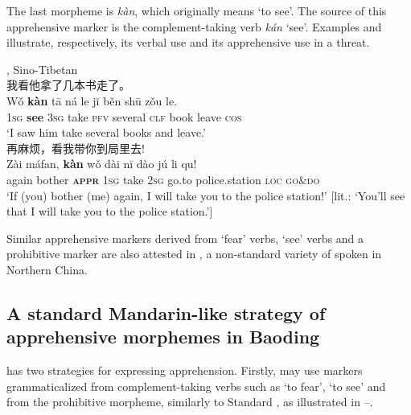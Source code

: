 \documentclass[output=paper,colorlinks,citecolor=brown, language=chinese]{langscibook}
\begin{document}
 The last morpheme is \textit{kàn}, which originally means `to see'. The source of this apprehensive marker is the complement-taking verb \textit{kán} `see'. Examples  and  illustrate, respectively, its verbal use and its apprehensive use in a threat.


\ea \label{ex:Song7} 
 {, Sino-Tibetan} {\cite{Gao2003}} \\
\ea \label{ex:Song7a} {\cn 我看他拿了几本书走了。} \\
\gll Wǒ \textbf{kàn} tā ná le jĭ běn shū zǒu le. \\
\textsc{1sg} \textbf{see} \textsc{3sg} take \textsc{pfv} several \textsc{clf} book leave \textsc{cos} \\
\glt `I saw him take several books and leave.' \\
\ex \label{ex:Song7b} {\cn 再麻烦，看我带你到局里去!} \\
\gll Zài máfan, \textbf{kàn} wǒ dài nĭ dào jú li qu! \\
again bother \textsc{\textbf{appr}} \textsc{1sg} take \textsc{2sg} go.to police.station \textsc{loc} \textsc{go\&do} \\
\glt `If (you) bother (me) again, I will take you to the police station!'
[lit.: `You'll see that I will take you to the police station.']
\z
\z

 Similar apprehensive markers derived from `fear' verbs, `see' verbs and a prohibitive marker are also attested in , a non-standard variety of  spoken in Northern China.



\subsection{A standard Mandarin-like strategy of apprehensive morphemes in Baoding}
\label{subsec:apprbaoding}


 has two strategies for expressing apprehension. Firstly,  may use markers grammaticalized from complement-taking verbs such as `to fear', `to see' and from the prohibitive morpheme, similarly to Standard , as illustrated in --.
\end{document}
